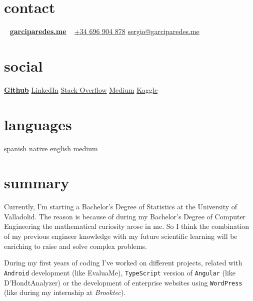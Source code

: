 \documentclass{friggeri-cv}
\begin{document}


  \begin{aside}
    \section{contact}
      ~
      \href{http://garciparedes.me}{\textbf{garciparedes.me}}
      ~
      \href{tel:+34 696 904 878}{+34 696 904 878}
      \href{mailto:sergio@garciparedes.me}{sergio@garciparedes.me}
    \section{social}
      \href{https://github.com/garciparedes}{\quad{\color{red} $\varheartsuit$}\quad\textbf{Github}\quad\faGithub }
      \href{https://es.linkedin.com/in/garciparedes/en}{LinkedIn\quad\faLinkedin }
      \href{http://stackoverflow.com/users/3921457/garciparedes}{Stack Overflow\quad\faStackOverflow }
      \href{https://medium.com/@garciparedes}{Medium\quad\faMedium }
      \href{https://www.kaggle.com/garciparedes}{Kaggle\quad\faTrophy }
    \section{languages}
      spanish native
      english medium
  \end{aside}




  \section{summary}

    Currently, I'm starting a Bachelor's Degree of Statistics at the University of Valladolid. The reason is because of during my Bachelor's Degree of Computer Engineering the mathematical curiosity arose in me. So I think the combination of my previous engineer knowledge with my future scientific learning will be enriching to raise and solve complex problems.

    During my first years of coding I've worked on different projects, related with \texttt{Android} development (like EvaluaMe), \texttt{TypeScript} version of \texttt{Angular} (like D'HondtAnalyzer) or the development of enterprise websites using \texttt{WordPress} (like during my internship at \emph{Brooktec}).
\end{document}
